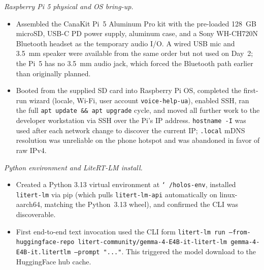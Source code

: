 \documentclass{article}
\theoremstyle{plain}
\theoremstyle{definition}
\theoremstyle{remark}
\begin{document}
\textit{Raspberry Pi 5 physical and OS bring-up.}
\begin{itemize}
\item Assembled the CanaKit Pi~5 Aluminum Pro kit with the pre-loaded 128~GB microSD, USB-C PD power supply, aluminum case, and a Sony WH-CH720N Bluetooth headset as the temporary audio I/O. A wired USB mic and 3.5~mm speaker were available from the same order but not used on Day~2; the Pi~5 has no 3.5~mm audio jack, which forced the Bluetooth path earlier than originally planned.
\item Booted from the supplied SD card into Raspberry Pi OS, completed the first-run wizard (locale, Wi-Fi, user account \texttt{voice-help-ua}), enabled SSH, ran the full \texttt{apt update \&\& apt upgrade} cycle, and moved all further work to the developer workstation via SSH over the Pi's IP address. \texttt{hostname -I} was used after each network change to discover the current IP; \texttt{.local} mDNS resolution was unreliable on the phone hotspot and was abandoned in favor of raw IPv4.
\end{itemize}

\textit{Python environment and LiteRT-LM install.}
\begin{itemize}
\item Created a Python 3.13 virtual environment at \texttt{\char`~/holos-env}, installed \texttt{litert-lm} via pip (which pulls \texttt{litert-lm-api} automatically on linux-aarch64, matching the Python~3.13 wheel), and confirmed the CLI was discoverable.
\item First end-to-end text invocation used the CLI form \texttt{litert-lm run --from-huggingface-repo litert-community/gemma-4-E4B-it-litert-lm gemma-4-E4B-it.litertlm --prompt "..."}. This triggered the model download to the HuggingFace hub cache.
\end{itemize}
\end{document}

